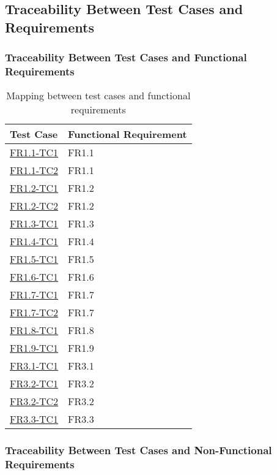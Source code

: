 \documentclass[12pt, titlepage]{article}
\begin{document}
\newpage
\subsection{Traceability Between Test Cases and Requirements}


\subsubsection{Traceability Between Test Cases and Functional Requirements}

\begin{table}[h!]
\begin{tabularx}{\textwidth}{p{5cm}p{5cm}}
\toprule {\bf Test Case} & {\bf Functional Requirement}\\
\midrule 
\hyperlink{FR1.1-TC1}{FR1.1-TC1} & FR1.1\\
\hyperlink{FR1.1-TC2}{FR1.1-TC2} & FR1.1\\
\hyperlink{FR1.2-TC1}{FR1.2-TC1} & FR1.2\\
\hyperlink{FR1.2-TC2}{FR1.2-TC2} & FR1.2\\
\hyperlink{FR1.3-TC1}{FR1.3-TC1} & FR1.3\\
\hyperlink{FR1.4-TC1}{FR1.4-TC1} & FR1.4\\
\hyperlink{FR1.5-TC1}{FR1.5-TC1} & FR1.5\\
\hyperlink{FR1.6-TC1}{FR1.6-TC1} & FR1.6\\
\hyperlink{FR1.7-TC1}{FR1.7-TC1} & FR1.7\\
\hyperlink{FR1.7-TC2}{FR1.7-TC2} & FR1.7\\
\hyperlink{FR1.8-TC1}{FR1.8-TC1} & FR1.8\\
\hyperlink{FR1.9-TC1}{FR1.9-TC1} & FR1.9\\
\midrule
\hyperlink{FR3.1-TC1}{FR3.1-TC1} & FR3.1\\
\hyperlink{FR3.2-TC1}{FR3.2-TC1} & FR3.2\\
\hyperlink{FR3.2-TC2}{FR3.2-TC2} & FR3.2\\
\hyperlink{FR3.3-TC1}{FR3.3-TC1} & FR3.3\\
\bottomrule
\end{tabularx}
\caption{Mapping between test cases and functional requirements}
\end{table}

\newpage
\subsubsection{Traceability Between Test Cases and Non-Functional Requirements}
\end{document}

